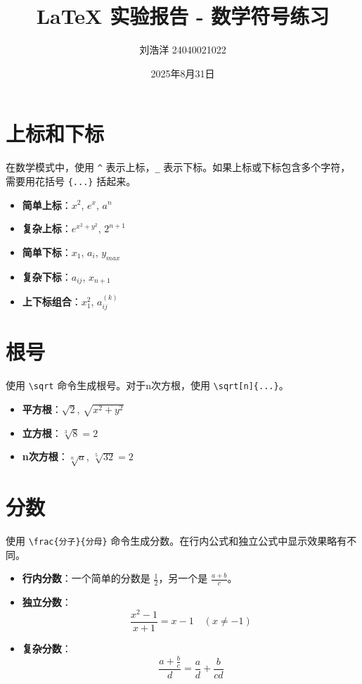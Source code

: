 \documentclass{article}
\title{LaTeX 实验报告 - 数学符号练习}
\author{刘浩洋 24040021022}
\date{2025年8月31日}
\begin{document}
\maketitle

\section{上标和下标}
在数学模式中，使用 \texttt{\^{}} 表示上标，\texttt{\_} 表示下标。如果上标或下标包含多个字符，需要用花括号 \texttt{\{...\}} 括起来。

\begin{itemize}
    \item \textbf{简单上标}：$x^2$, $e^x$, $a^n$
    \item \textbf{复杂上标}：$e^{x^2 + y^2}$, $2^{n+1}$
    \item \textbf{简单下标}：$x_1$, $a_i$, $y_{max}$
    \item \textbf{复杂下标}：$a_{ij}$, $x_{n+1}$
    \item \textbf{上下标组合}：$x_1^2$, $a_{ij}^{(k)}$
\end{itemize}

\section{根号}
使用 \texttt{\textbackslash sqrt} 命令生成根号。对于n次方根，使用 \texttt{\textbackslash sqrt[n]\{...\}}。

\begin{itemize}
    \item \textbf{平方根}：$\sqrt{2}$, $\sqrt{x^2 + y^2}$
    \item \textbf{立方根}：$\sqrt[3]{8} = 2$
    \item \textbf{n次方根}：$\sqrt[n]{a}$, $\sqrt[5]{32} = 2$
\end{itemize}

\section{分数}
使用 \texttt{\textbackslash frac\{分子\}\{分母\}} 命令生成分数。在行内公式和独立公式中显示效果略有不同。

\begin{itemize}
    \item \textbf{行内分数}：一个简单的分数是 $\frac{1}{2}$，另一个是 $\frac{a+b}{c}$。
    \item \textbf{独立分数}：
    \[
    \frac{x^2 - 1}{x + 1} = x - 1 \quad (x \neq -1)
    \]
    \item \textbf{复杂分数}：
    \[
    \frac{a + \frac{b}{c}}{d} = \frac{a}{d} + \frac{b}{cd}
    \]
\end{itemize}
\end{document}
